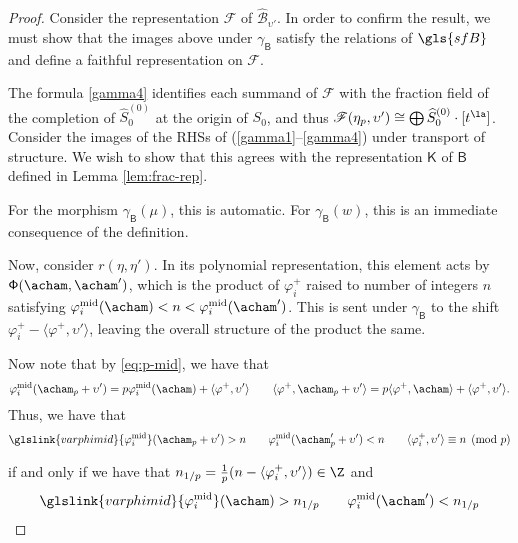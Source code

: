   
  \begin{proof}
  Consider the representation $\mathscr{F}$ of  $\widehat{\mathscr{B}}_{\upsilon'}$.  In order to confirm the result, we must show that the images above under $\gamma_{\mathsf{B}}$ satisfy the relations of $\gls{sfB}$ and define a faithful representation on $\mathscr{F}$. 
  
  The formula \ref{gamma4} identifies each summand of $\mathscr{F}$ with the fraction field of the completion of $\widehat{S}_0^{(0)}$ at the origin of $S_0$, and thus $\mathscr{F}(\eta_p,\upsilon')\cong \bigoplus \widehat{S}_0^{(0)}\cdot [t^\la]$.  Consider the images of the RHSs of (\ref{gamma1}--\ref{gamma4}) under transport of structure.  We wish to show that this agrees with the representation $\mathsf{K}$ of $\mathsf{B}$ defined in Lemma \ref{lem:frac-rep}.  
  
For the morphism $\gamma_{\mathsf{B}}(\mu)$, this is automatic.  For $\gamma_{\mathsf{B}}(w)$, this is an immediate consequence of the definition.  
  
Now, consider $r(\eta,\eta')$.  In its polynomial
representation, this element acts by
${\mathsf{\Phi}(\acham,\acham')}$, which is the product of $\varphi_i^+$ raised to number of
integers $n$ satisfying ${\varphi}^{\operatorname{mid}}_i(\acham)< n<
{\varphi}^{\operatorname{mid}}_i(\acham')$.  This is sent under
$\gamma_{\mathsf{B}}$ to the shift $\varphi_i^+-\langle
\varphi^+,\upsilon'\rangle$, leaving the overall structure of the
product the same.  

Now note that by \eqref{eq:p-mid}, we have that
\[{\varphi}^{\operatorname{mid}}_i(\acham_p+\upsilon') =p \varphi^{\operatorname{mid}}_i(\acham)+\langle
\varphi^+,\upsilon'\rangle\qquad \langle \varphi^+,\acham_p+\upsilon'\rangle =p \langle \varphi^+,\acham\rangle+\langle
\varphi^+,\upsilon'\rangle.\]
Thus, we have that
\begin{equation}
\glslink{varphimid}{\varphi_i^{\operatorname{mid}}}(\acham_p+\upsilon')>n\qquad \varphi_i^{\operatorname{mid}}(\acham_p'+\upsilon')<n \qquad
  \langle\varphi^+_i,\upsilon'\rangle\equiv n\pmod p\label{eq:hyperplanes1}
\end{equation}

if and only if we have that
$n_{1/p}=\frac{1}{p}(n-\langle\varphi^+_i,\upsilon'\rangle)\in \Z$ and 
\begin{equation}
\glslink{varphimid}{\varphi_i^{\operatorname{mid}}}(\acham)>n_{1/p}\qquad
\varphi_i^{\operatorname{mid}}(\acham')<n_{1/p}\label{eq:hyperplanes2}
\end{equation}


\end{proof}
